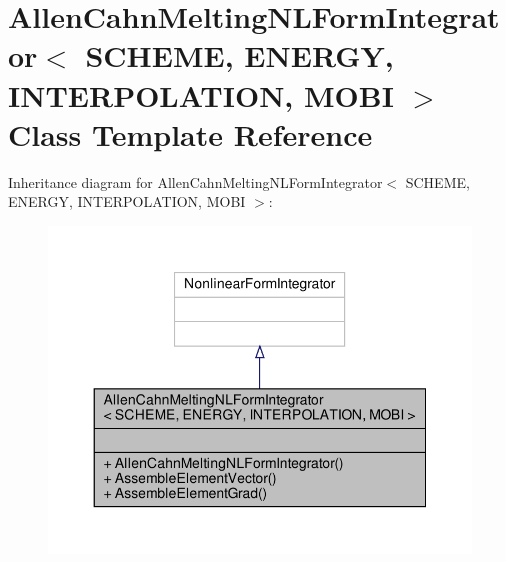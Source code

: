 \hypertarget{classAllenCahnMeltingNLFormIntegrator}{}\section{Allen\+Cahn\+Melting\+N\+L\+Form\+Integrator$<$ S\+C\+H\+E\+ME, E\+N\+E\+R\+GY, I\+N\+T\+E\+R\+P\+O\+L\+A\+T\+I\+ON, M\+O\+BI $>$ Class Template Reference}
\label{classAllenCahnMeltingNLFormIntegrator}


Inheritance diagram for Allen\+Cahn\+Melting\+N\+L\+Form\+Integrator$<$ S\+C\+H\+E\+ME, E\+N\+E\+R\+GY, I\+N\+T\+E\+R\+P\+O\+L\+A\+T\+I\+ON, M\+O\+BI $>$\+:\nopagebreak
\begin{figure}[H]
\begin{center}
\leavevmode
\includegraphics[width=350pt]{classAllenCahnMeltingNLFormIntegrator__inherit__graph}
\end{center}
\end{figure}


